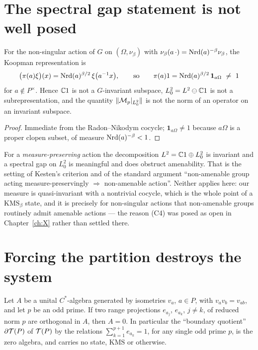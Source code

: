\section{The spectral gap statement is not well posed}

\begin{proposition}\label{XI:prop:notinvariant}
For the non-singular action of $G$ on $(\Omega,\nu_\beta)$ with
$\nu_\beta(a\,\cdot)=\operatorname{Nrd}(a)^{-\beta}\nu_\beta$, the Koopman representation is
\[
\bigl(\pi(a)\xi\bigr)(x)=\operatorname{Nrd}(a)^{\beta/2}\,\xi\bigl(a^{-1}x\bigr),
\qquad\text{so}\qquad
\pi(a)1=\operatorname{Nrd}(a)^{\beta/2}\,\mathbf 1_{a\Omega}\ \ne\ 1
\]
for $a\notin P^\times$. Hence $\mathbb{C}1$ is not a $G$-invariant subspace, $L^2_0=L^2\ominus\mathbb{C}1$ is
not a subrepresentation, and the quantity $\|\mathcal{M}_p|_{L^2_0}\|$ is not the norm of an operator
on an invariant subspace.
\end{proposition}

\begin{proof}
Immediate from the Radon--Nikodym cocycle; $\mathbf 1_{a\Omega}\ne1$ because $a\Omega$ is a
proper clopen subset, of measure $\operatorname{Nrd}(a)^{-\beta}<1$.
\end{proof}

\begin{remark}\label{XI:rem:whymatters}
For a \emph{measure-preserving} action the decomposition $L^2=\mathbb{C}1\oplus L^2_0$ is invariant
and a spectral gap on $L^2_0$ is meaningful and does obstruct amenability. That is the
setting of Kesten's criterion and of the standard argument ``non-amenable group acting
measure-preservingly $\Rightarrow$ non-amenable action''. Neither applies here: our measure is
quasi-invariant with a nontrivial cocycle, which is the whole point of a
$\mathrm{KMS}_\beta$ state, and it is precisely for non-singular actions that non-amenable
groups routinely admit amenable actions \cite{AD,Zimmer} --- the reason (C4) was posed as
open in Chapter~\ref{ch:X} rather than settled there.
\end{remark}

\section{Forcing the partition destroys the system}

\begin{theorem}\label{XI:thm:noboundary}
Let $A$ be a unital $C^*$-algebra generated by isometries $v_a$, $a\in P$, with
$v_av_b=v_{ab}$, and let $p$ be an odd prime. If two range projections $e_{a_j}$, $e_{a_k}$,
$j\ne k$, of reduced norm $p$ are orthogonal in $A$, then $A=0$. In particular the
``boundary quotient'' $\partial\mathcal{T}(P)$ of $\mathcal{T}(P)$ by the relations
$\sum_{k=1}^{p+1}e_{a_k}=1$, for any single odd prime $p$, is the zero algebra, and carries
no state, $\mathrm{KMS}$ or otherwise.
\end{theorem}

